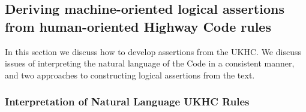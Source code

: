 
\subsection{Deriving machine-oriented logical assertions from human-oriented Highway Code rules}
In this section we discuss how to develop assertions from the UKHC. We discuss issues of interpreting the natural language of the Code in a consistent manner, and two approaches to constructing logical assertions from the text. 

\subsubsection{Interpretation of Natural Language UKHC Rules} \label{interp_nat_lang_UKHC_rules}

